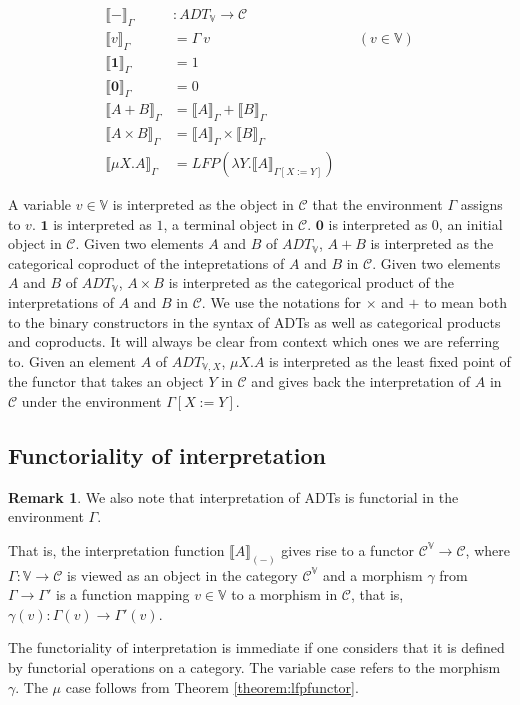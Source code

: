 \documentclass{msthesis}
\theoremstyle{definition}
\newtheorem*{remark}{Remark}
\newcommand{\semof}[1]{\llbracket{#1}\rrbracket}
\newcommand{\mcC}{\mathcal{C}}
\newcommand{\vars}{\mathbb{V}}
\begin{document}
\begin{align*}
    \semof{-}_\Gamma &: ADT_\vars \to \mcC \\
    \semof{v}_\Gamma &= \Gamma\ v && (v \in \vars) \\
    \semof{\mathbf{1}}_\Gamma &= 1 \\
    \semof{\mathbf{0}}_\Gamma &= 0 \\
    \semof{A + B}_\Gamma &= \semof{A}_\Gamma + \semof{B}_\Gamma \\
    \semof{A \times B}_\Gamma &= \semof{A}_\Gamma \times \semof{B}_\Gamma \\
    \semof{\mu X.A}_\Gamma &= LFP(\lambda Y. \semof{A}_{\Gamma[X := Y]})
\end{align*}

A variable $v \in \vars$ is interpreted as the object in $\mcC$ that the environment $\Gamma$ assigns to $v$.  $\mathbf{1}$ is interpreted as $1$, a terminal object in $\mcC$.  $\mathbf{0}$ is interpreted as $0$, an initial object in $\mcC$.  Given two elements $A$ and $B$ of $ADT_\vars$, $A + B$ is interpreted as the categorical coproduct of the intepretations of $A$ and $B$ in $\mcC$.  Given two elements $A$ and $B$ of $ADT_\vars$, $A \times B$ is interpreted as the categorical product of the interpretations of $A$ and $B$ in $\mcC$.  We use the notations for $\times$ and $+$ to mean both to the binary constructors in the syntax of ADTs as well as categorical products and coproducts.  It will always be clear from context which ones we are referring to. Given an element $A$ of $ADT_{\vars,X}$, $\mu X.A$ is interpreted as the least fixed point of the functor that takes an object $Y$ in $\mcC$ and gives back the interpretation of $A$ in $\mcC$ under the environment $\Gamma[X := Y]$.

\subsection*{Functoriality of interpretation}
\begin{remark}
We also note that interpretation of ADTs is functorial in the environment $\Gamma$.

That is, the interpretation function $\semof{A}_{(-)}$ gives rise to a functor 
$\mcC^\vars \to \mcC$, where $\Gamma : \vars \to \mcC$ is viewed as an object in the category $\mcC^\vars$
and a morphism $\gamma$ from $\Gamma \to \Gamma'$ is a function mapping $v \in \vars$
to a morphism in $\mcC$, that is, $\gamma(v) : \Gamma(v) \to \Gamma'(v)$.

The functoriality of interpretation is immediate if one considers that it is defined by functorial operations on a category.
The variable case refers to the morphism $\gamma$. The $\mu$ case follows from Theorem \ref{theorem:lfpfunctor}.
\end{remark}
\end{document}
